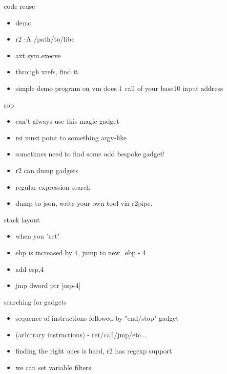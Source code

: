 \documentclass[10pt,pdf,utf8,english,compress,hyperref={unicode}]{beamer}
\begin{document}
\begin{frame}{code reuse}
	\begin{itemize}
		\item demo
		\item r2 -A /path/to/libc
		\item axt sym.execve
		\item through xrefs, find it.
		\item simple demo program on vm does 1 call of your base10 input address
	\end{itemize}
\end{frame}

\begin{frame}{rop}
	\begin{itemize}
		\item can't always use this magic gadget
		\item rsi must point to something argv-like
		\item sometimes need to find some odd bespoke gadget!
		\item r2 can dump gadgets
		\item regular expression search
		\item dump to json, write your own tool via r2pipe.
	\end{itemize}
\end{frame}

\begin{frame}{stack layout}
	\begin{itemize}
			\item when you "ret"
			\item ebp is increased by 4, jump to new\_ebp - 4
			\item add esp,4
			\item jmp dword ptr [esp-4]
	\end{itemize}
\end{frame}

\begin{frame}{searching for gadgets}
	\begin{itemize}
			\item sequence of instructions followed by "end/stop" gadget
			\item (arbitrary instructions) - ret/call/jmp/etc...
			\item finding the right ones is hard, r2 has regexp support
			\item we can set variable filters.
	\end{itemize}
\end{frame}
\end{document}
